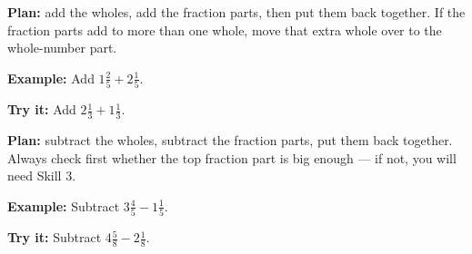 \documentclass[12pt]{article}
\begin{document}


\begin{formulabox}
\textbf{Plan:} add the wholes, add the fraction parts, then put them back
together. If the fraction parts add to more than one whole, move that extra
whole over to the whole-number part.
\end{formulabox}

\begin{examplebox}
\textbf{Example:} \quad Add $1\tfrac{2}{5} + 2\tfrac{1}{5}$.
\end{examplebox}

\begin{tryitbox}
\textbf{Try it:} \quad Add $2\tfrac{1}{3} + 1\tfrac{1}{3}$.\\[2pt]
\end{tryitbox}


\begin{formulabox}
\textbf{Plan:} subtract the wholes, subtract the fraction parts, put them
back together. Always check first whether the top fraction part is big
enough --- if not, you will need Skill 3.
\end{formulabox}

\begin{examplebox}
\textbf{Example:} \quad Subtract $3\tfrac{4}{5} - 1\tfrac{1}{5}$.
\end{examplebox}

\begin{tryitbox}
\textbf{Try it:} \quad Subtract $4\tfrac{5}{8} - 2\tfrac{1}{8}$.\\[2pt]
\end{tryitbox}

\end{document}
